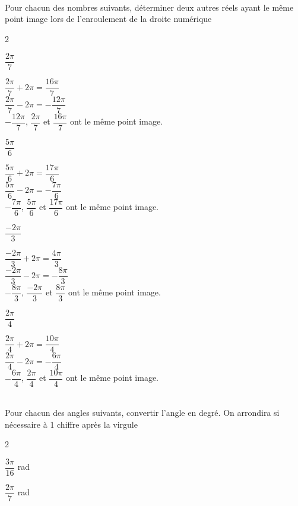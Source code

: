 \documentclass[a4paper,12pt]{article}        %
\begin{document}
\\
Pour chacun des nombres suivants, déterminer deux autres réels ayant le même point image lors de l'enroulement de la droite numérique
\begin{multicols}{2}
\begin{enumMet}
    \item $\dfrac{2\pi}{7}$\\
    \begin{corrBox}
        $\dfrac{2\pi}{7}+2\pi=\dfrac{16\pi}{7}$\\
        $\dfrac{2\pi}{7}-2\pi=-\dfrac{12\pi}{7}$\\
        $-\dfrac{12\pi}{7}$, $\dfrac{2\pi}{7}$ et $\dfrac{16\pi}{7}$ ont le même point image.
    \end{corrBox}
    \item $\dfrac{5\pi}{6}$\\
    \begin{corrBox}
        $\dfrac{5\pi}{6}+2\pi=\dfrac{17\pi}{6}$\\
        $\dfrac{5\pi}{6}-2\pi=-\dfrac{7\pi}{6}$\\
        $-\dfrac{7\pi}{6}$, $\dfrac{5\pi}{6}$ et $\dfrac{17\pi}{6}$ ont le même point image.
    \end{corrBox}
    \item $\dfrac{-2\pi}{3}$\\
    \begin{corrBox}
        $\dfrac{-2\pi}{3}+2\pi=\dfrac{4\pi}{3}$\\
        $\dfrac{-2\pi}{3}-2\pi=-\dfrac{8\pi}{3}$\\
        $-\dfrac{8\pi}{3}$, $\dfrac{-2\pi}{3}$ et $\dfrac{8\pi}{3}$ ont le même point image.
    \end{corrBox}
    \item $\dfrac{2\pi}{4}$\\
    \begin{corrBox}
        $\dfrac{2\pi}{4}+2\pi=\dfrac{10\pi}{4}$\\
        $\dfrac{2\pi}{4}-2\pi=-\dfrac{6\pi}{4}$\\
        $-\dfrac{6\pi}{4}$, $\dfrac{2\pi}{4}$ et $\dfrac{10\pi}{4}$ ont le même point image.
    \end{corrBox}
\end{enumMet}
\end{multicols}

\\
Pour chacun des angles suivants, convertir l'angle en degré. On arrondira si nécessaire à 1 chiffre après la virgule
\begin{multicols}{2}
\begin{enumMet}
    \item $\dfrac{3\pi}{16}$ rad \quad {}
    \item $\dfrac{2\pi}{7}$ rad \quad {}
\end{enumMet}
\end{multicols}
\end{document}
